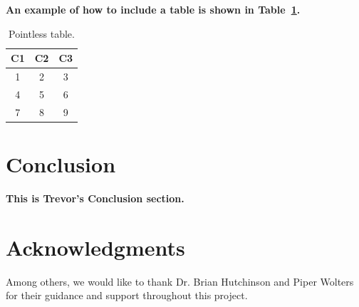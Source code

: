 \documentclass[conference, letterpaper, 11pt]{IEEEtran}
\begin{document}
\textbf{An example of how to include a table is shown in Table~\ref{tab:xmp}.} \lipsum[1]

\begin{table}[htbp]
    \caption{Pointless table.}
    \begin{center}
        \begin{tabular}{|c|c|c|}
            \hline
            \textbf{C1} & \textbf{C2} & \textbf{C3} \\
            \hline
            1 & 2 & 3 \\
            4 & 5 & 6 \\
            7 & 8 & 9 \\
            \hline
        \end{tabular}
    \end{center}
    \label{tab:xmp}
\end{table}

\colorbox{red}{}
\colorbox{red}{}

\lipsum[1-10]

\section{Conclusion} \label{CO}
\textbf{This is Trevor's Conclusion section.} \lipsum[1-2]

\section*{Acknowledgments}

Among others, we would like to thank Dr. Brian Hutchinson and Piper Wolters for their guidance and support throughout this project. \lipsum[][1-2]

\printbibliography
\end{document}
